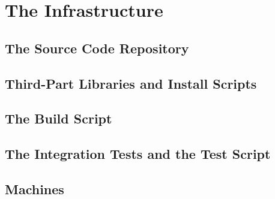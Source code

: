 \chapter{The Infrastructure} \label{cap:infrastructure}

\section{The Source Code Repository}
\section{Third-Part Libraries and Install Scripts}
\section{The Build Script}
\section{The Integration Tests and the Test Script}
\section{Machines}
